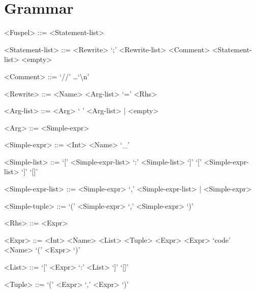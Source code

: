 \section{Grammar}
\label{sec:grammar}

\setlength{\grammarparsep}{4pt}
\setlength{\grammarindent}{10em}
\begin{grammar}
	<Fuspel> ::= <Statement-list>

	<Statement-list> ::= <Rewrite> `;' <Rewrite-list>
		\alt <Comment> <Statement-list>
		\alt <empty>

	<Comment> ::= `//' \dots `\textbackslash n'

	<Rewrite> ::= <Name> <Arg-list> `=' <Rhs>

	<Arg-list> ::= <Arg> ` ' <Arg-list> | <empty>

	<Arg> ::= <Simple-expr>

	<Simple-expr> ::= <Int>
		\alt <Simple-list>
		\alt <Simple-tuple>
		\alt `_'

	<Simple-list> ::= `[' <Simple-expr-list> `:' <Simple-list> `]'
		\alt `[' <Simple-expr-list> `]'
		\alt `[]'

	<Simple-expr-list> ::= <Simple-expr> `,' <Simple-expr-list> | <Simple-expr>
	
	<Simple-tuple> ::= `(' <Simple-expr> `,' <Simple-expr> `)'

	<Rhs> ::= <Expr>

	<Expr> ::= <Int>
		\alt <Tuple>
		 <Expr>
		\alt `code' <Name>
		\alt `(' <Expr> `)'

	<List> ::= `[' <Expr> `:' <List> `]'
		\alt `[]'
	
	<Tuple> ::= `(' <Expr> `,' <Expr> `)'
\end{grammar}

